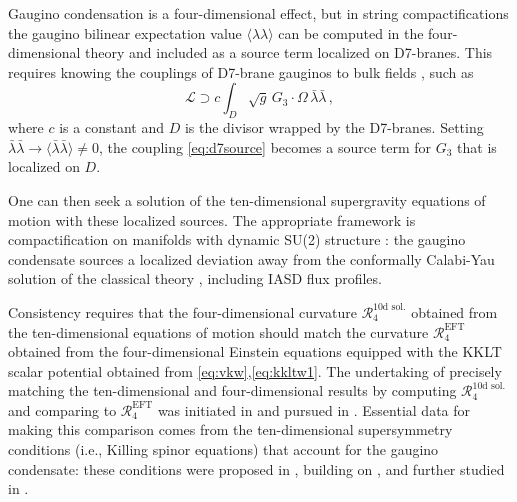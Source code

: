 \documentclass[12pt,a4wide]{article}
\begin{document}
Gaugino condensation is a four-dimensional effect, but in string compactifications the gaugino bilinear expectation value $\langle \lambda\lambda\rangle$ can be computed in the four-dimensional theory and included as a source term localized on D7-branes.
This requires knowing the couplings of D7-brane gauginos to bulk fields \cite{Camara:2004jj,Dymarsky:2010mf}, such as 
\begin{equation}\label{eq:d7source}
\mathcal{L} \supset c \int_{D} \sqrt{g}\, G_3{\cdot}\Omega\, \bar{\lambda} \bar{\lambda}\,,
\end{equation} where $c$ is a constant and $D$ is the divisor wrapped by the D7-branes.
Setting $\bar{\lambda} \bar{\lambda} \to \langle \bar{\lambda} \bar{\lambda}\rangle \neq 0$, the coupling \eqref{eq:d7source} becomes a source term for $G_3$ that is localized on $D$.
 
One can then seek a solution of the ten-dimensional supergravity equations of motion with these localized sources.
The appropriate framework is compactification on manifolds with dynamic SU(2) structure \cite{Grana:2005sn}: the gaugino condensate sources a localized deviation away from the conformally Calabi-Yau solution of the classical theory \cite{Koerber:2007xk,Heidenreich:2010ad,Baumann:2010sx,Dymarsky:2010mf},
including IASD flux profiles.

Consistency requires that the four-dimensional curvature $\mathcal{R}_4^{\text{10d sol.}}$ obtained from the ten-dimensional equations of motion should match the curvature $\mathcal{R}_4^{\text{EFT}}$ obtained from the four-dimensional Einstein equations equipped with the KKLT scalar potential obtained from \eqref{eq:vkw},\eqref{eq:kkltw1}.
The undertaking of precisely matching the ten-dimensional and four-dimensional results by computing $\mathcal{R}_4^{\text{10d sol.}}$ and comparing to $\mathcal{R}_4^{\text{EFT}}$ was initiated in 
\cite{Moritz:2017xto} and pursued in \cite{Hamada:2018qef,Gautason:2018gln,Carta:2019rhx,Gautason:2019jwq,Hamada:2019ack}.  Essential data for making this comparison comes from the ten-dimensional supersymmetry conditions (i.e., Killing spinor equations) that account for the gaugino condensate:
these conditions were proposed in \cite{Koerber:2007xk}, building on \cite{Grana:2005sn}, and further studied in \cite{Bena:2019mte}.


 
 
\end{document}
